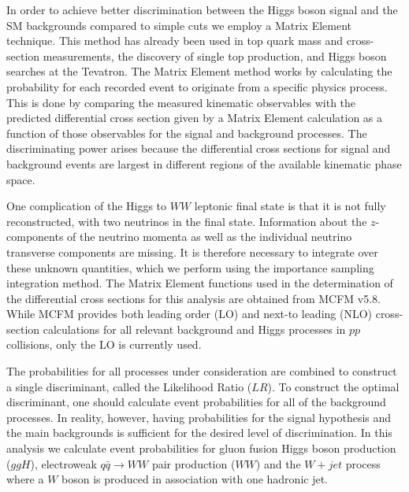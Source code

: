 In order to achieve better discrimination between the Higgs boson signal and the SM backgrounds
compared to simple cuts we employ a Matrix Element technique. 
This method has already been used in top quark mass and cross-section 
measurements, the discovery of single top production, and Higgs boson searches at the Tevatron.  
The Matrix Element method works by calculating the probability for each recorded
event to originate from a specific physics process.
This is done by comparing the measured kinematic observables with the predicted
differential cross section given by a Matrix Element calculation
as a function of those observables for the signal and background processes.
The discriminating power arises because the differential cross sections for 
signal and background events are largest in different regions of the available
kinematic phase space. 

One complication of the Higgs to $WW$ leptonic final state is that it is not fully 
reconstructed, with two neutrinos in the final state. 
Information about the $z$-components of the neutrino momenta as well as the individual 
neutrino transverse components are missing. It is therefore necessary to integrate 
over these unknown quantities, which we perform using the importance sampling 
integration method.
The Matrix Element functions used in the determination of the differential cross sections
for this analysis are obtained from  MCFM v5.8.  While MCFM 
provides both leading order (LO) and next-to leading (NLO) cross-section calculations for 
all relevant background and Higgs processes in $pp$ collisions, only the
LO is currently used.

The probabilities for all processes under consideration are combined 
to construct a single discriminant, called the Likelihood Ratio ($LR$).  
To construct the optimal discriminant, one should calculate 
event probabilities for all of the background processes. In reality, however, having 
probabilities for the signal hypothesis and the main backgrounds is sufficient for the 
desired level of discrimination. In this analysis we calculate event probabilities 
for gluon fusion Higgs boson production ($ggH$), electroweak $q\bar{q}\rightarrow WW$ pair 
production ($WW$) and the $W+jet$ process where a $W$ boson is produced in association with one hadronic jet. 


